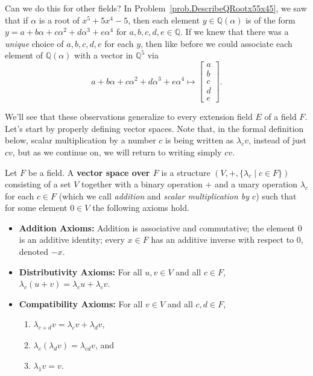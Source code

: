 Can we do this for other fields? In Problem~\ref{prob.DescribeQRootx55x45}, we saw that if $\alpha$ is a root of $x^5 + 5x^4 - 5$, then each element $y\in\mathbb{Q}(\alpha)$ is of the form $y= a + b\alpha + c\alpha^2 + d\alpha^3 + e\alpha^4$ for $a,b,c,d,e\in \mathbb{Q}$. If we knew that there was a \emph{unique} choice of $a,b,c,d,e$ for each $y$, then like before we could associate each element of $\mathbb{Q}(\alpha)$ with a vector in $\mathbb{Q}^5$ via 
\[ a + b\alpha + c\alpha^2 + d\alpha^3 + e\alpha^4 \mapsto \begin{bmatrix} a\\b\\c\\d\\e\end{bmatrix}.\]

We'll see that these observations generalize to every extension field $E$ of a field $F$. Let's start by properly defining vector spaces. Note that, in the formal definition below, scalar multiplication by a number $c$ is being written as $\lambda_cv$, instead of just $cv$, but as we continue on, we will return to writing simply $cv$.

\begin{definition}
Let $F$ be a field. A \textbf{vector space over $F$} is a structure $(V,+,\{\lambda_c\mid c\in F\})$ consisting of a set $V$ together with a binary operation $+$ and a unary operation $\lambda_c$ for each $c\in F$ (which we call \emph{addition} and \emph{scalar multiplication by $c$}) such that for some element $0\in V$ the following axioms hold.
\begin{itemize}
\item \textbf{Addition Axioms:} Addition is associative and commutative; the element $0$ is an additive identity; every  $x\in F$ has an additive inverse with respect to $0$, denoted $-x$.
\item \textbf{Distributivity Axioms:} For all $u,v \in V$ and all $c\in F$, $\lambda_c(u+v) = \lambda_cu+\lambda_cv$.
\item \textbf{Compatibility Axioms:} For all $v \in V$ and all $c,d\in F$, 
\begin{enumerate}
\item $\lambda_{c+d}v = \lambda_cv + \lambda_dv$,
\item $\lambda_c(\lambda_dv) = \lambda_{cd}v$, and
\item $\lambda_1v = v$.
\end{enumerate}
\end{itemize}
\end{definition}

